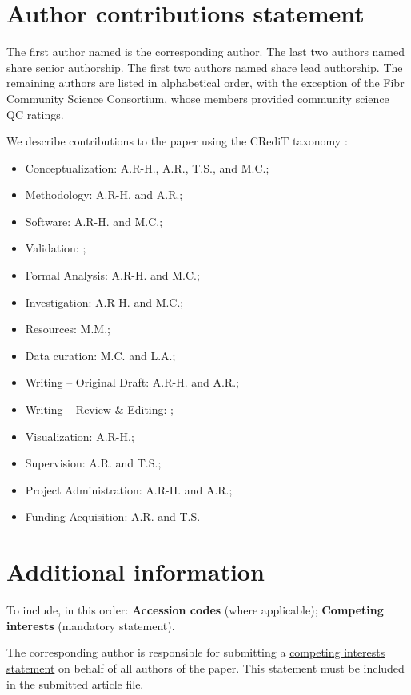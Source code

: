 \documentclass[fleqn,10pt]{wlscirep}
\begin{document}
\section*{Author contributions statement}

The first author named is the corresponding author. The last two authors named
share senior authorship. The first two authors named share lead authorship. The
remaining authors are listed in alphabetical order, with the exception of
the Fibr Community Science Consortium, whose members provided community science
QC ratings.


We describe contributions to the paper using the CRediT taxonomy \cite{brand2015-vd,allen2014-oc}:
\begin{itemize}
    \item Conceptualization: A.R-H., A.R., T.S., and M.C.;
    \item Methodology: A.R-H. and A.R.;
    \item Software: A.R-H. and M.C.;
    \item Validation: ;
    \item Formal Analysis: A.R-H. and M.C.;
    \item Investigation: A.R-H. and M.C.;
    \item Resources: M.M.;
    \item Data curation: M.C. and L.A.;
    \item Writing – Original Draft: A.R-H. and A.R.;
    \item Writing – Review \& Editing: ;
    \item Visualization: A.R-H.;
    \item Supervision: A.R. and T.S.;
    \item Project Administration: A.R-H. and A.R.;
    \item Funding Acquisition: A.R. and T.S.
\end{itemize}

\section*{Additional information}

To include, in this order: \textbf{Accession codes} (where applicable);
\textbf{Competing interests} (mandatory statement).

The corresponding author is responsible for submitting a
\href{http://www.nature.com/srep/policies/index.html#competing}{competing
interests statement} on behalf of all authors of the paper. This statement must
be included in the submitted article file.
\end{document}
